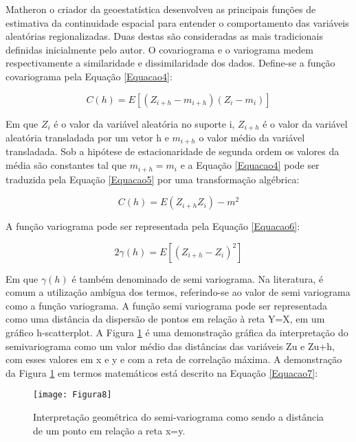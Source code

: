 Matheron o criador da geoestatística desenvolveu as principais funções de estimativa da continuidade espacial para entender o comportamento das variáveis aleatórias regionalizadas. Duas destas são consideradas as mais tradicionais definidas inicialmente pelo autor. O covariograma e o variograma medem respectivamente a similaridade e dissimilaridade dos dados. Define-se a função covariograma pela Equação \ref{Equacao4}:

\begin{equation}\label{Equacao4}
C(h) = E\left[ \left( Z_{i+h} - m_{i+h} \right) \left( Z_i -m_i\right) \right] 
\end{equation}

Em que $Z_i$ é o valor da variável aleatória no suporte i, $Z_{i+h}$ é o valor da variável aleatória transladada por um vetor h e $m_{i+h}$ o valor médio da variável transladada. Sob a hipótese de estacionaridade de segunda ordem os valores da média são constantes tal que $m_{i+h}=m_i$ e a Equação \ref{Equacao4}  pode ser traduzida pela Equação \ref{Equacao5} por uma transformação algébrica: 

\begin{equation}\label{Equacao5}
C(h) = E\left( Z_{i+h}Z_i\right)  -m^2
\end{equation}

A função variograma pode ser representada pela Equação \ref{Equacao6}:

\begin{equation}\label{Equacao6}
2\gamma(h) = E\left[ \left( Z_{i+h}-Z_i\right)^2\right] 
\end{equation}

Em que $\gamma(h)$ é também denominado de semi variograma. Na literatura, é comum a utilização ambígua dos termos, referindo-se ao valor de semi variograma como a função variograma. A função semi variograma pode ser representada como uma distância da dispersão de pontos em relação à reta Y=X, em um gráfico h-scatterplot.  A Figura \ref{Figura8} é uma demonstração gráfica da interpretação do semivariograma como um valor médio das distâncias das variáveis Zu e Zu+h, com esses valores em x e y e com a reta de correlação máxima. A demonstração da Figura \ref{Figura8} em termos matemáticos está descrito na Equação \ref{Equacao7}:

\begin{figure}[h]
	\centering
	\texttt{[image: Figura8]}
	\caption{Interpretação geométrica do semi-variograma como sendo a distância de um ponto em relação a reta x=y.}
	\label{Figura8}
\end{figure}


